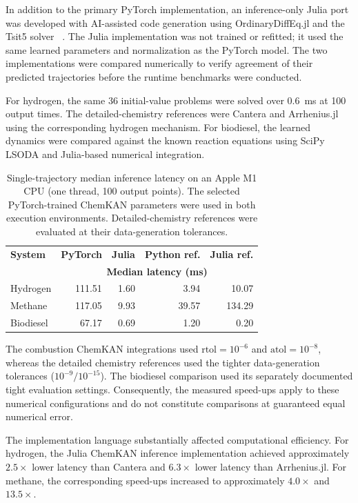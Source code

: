 \documentclass[11pt,a4paper]{article}
\begin{document}
In addition to the primary PyTorch
implementation, an inference-only Julia
port was developed with AI-assisted code
generation using OrdinaryDiffEq.jl and
the Tsit5 solver
~\cite{Rackauckas-2017}. The Julia
implementation was not trained or
refitted; it used the same learned
parameters and normalization as the
PyTorch model. The two implementations
were compared numerically to verify
agreement of their predicted trajectories
before the runtime benchmarks were
conducted.

For hydrogen, the same 36 initial-value problems
were solved over 0.6~ms at 100 output times.
The detailed-chemistry references were Cantera and
Arrhenius.jl using the corresponding hydrogen
mechanism. For biodiesel, the learned dynamics were
compared against the known reaction equations using
SciPy LSODA and Julia-based numerical integration.


\begin{table}[htbp]
\centering
\small
\caption{Single-trajectory median inference latency
on an Apple M1 CPU (one thread, 100 output points).
The selected PyTorch-trained ChemKAN parameters
were used in both execution environments.
Detailed-chemistry references were evaluated
at their data-generation tolerances.}
\label{tab:efficiency}
\begin{tabular}{@{}lrrrr@{}}
\toprule
\textbf{System} &
\textbf{PyTorch} &
\textbf{Julia} &
\textbf{Python ref.} &
\textbf{Julia ref.} \\
& \multicolumn{4}{c}{\textbf{Median latency (ms)}} \\
\midrule
Hydrogen  & 111.51 & 1.60 & 3.94 & 10.07 \\
Methane   & 117.05 & 9.93 & 39.57 & 134.29 \\
Biodiesel & 67.17  & 0.69 & 1.20 & 0.20 \\
\bottomrule
\end{tabular}
\end{table}


The combustion ChemKAN integrations used
$\mathrm{rtol}=10^{-6}$ and
$\mathrm{atol}=10^{-8}$, whereas the detailed
chemistry references used the tighter
data-generation tolerances
($10^{-9}/10^{-15}$).
The biodiesel comparison used its separately
documented tight evaluation settings.
Consequently, the measured speed-ups apply
to these numerical configurations and do
not constitute comparisons at guaranteed
equal numerical error.

The implementation language substantially affected
computational efficiency. For hydrogen, the Julia
ChemKAN inference implementation achieved
approximately $2.5\times$ lower latency than
Cantera and $6.3\times$ lower latency than
Arrhenius.jl. For methane, the corresponding
speed-ups increased to approximately $4.0\times$
and $13.5\times$.
\end{document}
